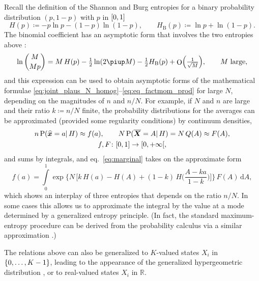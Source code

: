 \documentclass{article}
\newcommand*{\citep}{\parencites}
\theoremstyle{innote}
\newcommand*{\av}{\overline} %
\newcommand*{\sav}{\widehat} %
\newcommand*{\yx}{\bm{x}}%
\newcommand*{\yxs}{\sav{\yx}}%
\newcommand*{\yX}{\bm{X}}%
\newcommand*{\yXf}{\av{\yX}}%
\newcommand*{\yH}{\varEta}
\newcommand*{\ysh}{H}
\newcommand*{\ybu}{H_{\text{B}}}
\DeclarePairedDelimiter\set{\{}{\}}
\newcommand*{\defd}{\coloneqq}
\newcommand*{\cond}%
{\mathpunct{|}}%
\newcommand*{\p}{\mathrm{P}}%
\renewcommand*{\|}{\cond}
\newcommand*{\+}{\lor}
\newcommand*{\sect}{\S}%
\newcommand*{\chap}{ch.}%
\newcommand*{\eqn}{eq.}%
\let\varEta H
\newcommand*{\di}{\mathrm{d}}%
\newcommand*{\RR}{\mathbb{R}}
\DeclareMathOperator{\Ord}{O}%
\DeclarePairedDelimiter\clcl{[}{]}
\DeclarePairedDelimiter\clop{[}{[}
\newcommand*{\pu}{\piup}%
\begin{document}
Recall the definition of the Shannon and Burg
\citep{burg1975,ericksonetal1988b} entropies for a binary probability
distribution $(p,1-p)$ with $p$ in $\clcl{0,1}$
\begin{equation}
  \label{eq:entropies}
\ysh(p) \defd -p\ln p -(1-p)\ln(1-p),
\qquad
\ybu(p) \defd \ln p +\ln(1-p).
\end{equation}
The binomial coefficient has an asymptotic form that involves the two
entropies above
\citep{robbins1955,weissman1983,mermin1983,dence1983,bowers1983,vedder1983,pathria1985}:
\begin{equation}
  \label{eq:binomial_asymp}
  \ln\binom{M}{Mp} = M\,\ysh(p) -\tfrac{1}{2}\ln(2\pu M)-\tfrac{1}{2}\ybu(p)
  + \Ord\Bigl(\tfrac{1}{\sqrt{M}}\Bigr),\qquad
\text{$M$ large},
\end{equation}
and this expression can be used to obtain asymptotic forms of the
mathematical formulae
\eqref{eq:joint_plaus_N_homog}--\eqref{eq:eq_factmom_prod} for large $N$,
depending on the magnitudes of $n$ and $n/N$. For example, if $N$ and $n$
are large and their ratio $k\defd n/N$ finite, the probability
distributions for the averages can be approximated (provided some
regularity conditions) by continuum densities,
\begin{equation}
  \label{eq:cont_approx}
  \begin{gathered}
  n\,\p(\yxs = a \cond\yH)\approx f(a),
\qquad
  N\,\p(\yXf = A \cond\yH)=N\,Q(A)\approx F(A),
\\
f,F\colon \clcl{0,1}\to\clop{0,+\infty},
\end{gathered}
\end{equation}
and sums by integrals, and \eqn~\eqref{eq:marginal} takes on the
approximate form
\begin{equation}
  \label{eq:marginal_continuum}
  f(a)
=
\int\limits_0^1
\exp\biggl\{
N\,\biggl[
k\,\ysh(a) - \ysh(A) + (1-k)\,\ysh\biggl( \frac{A-ka}{1-k} \biggr)
 \biggr]
\biggr\}\,
F(A)\,\di A,
\end{equation}
which shows an interplay of three entropies that depends on the ratio $n/N$. In
some cases this allows us to approximate the integral by the value at a mode
determined by a generalized entropy principle. (In fact, the standard
maximum-entropy procedure can be derived from the probability calculus via
a similar approximation \citep{portamana2009}.)

The relations above can also be generalized to $K$-valued states $X_i$ in
$\set{0,\dotsc,K-1}$, leading to the appearance of the generalized
hypergeometric distribution
\cites[\chap~3]{jaynes1994_r2003}[\sect~4.8.3]{ross1976_r2010}[\sect~II.6]{feller1950_r1968},
or to real-valued states $X_i$ in $\RR$.
\end{document}
